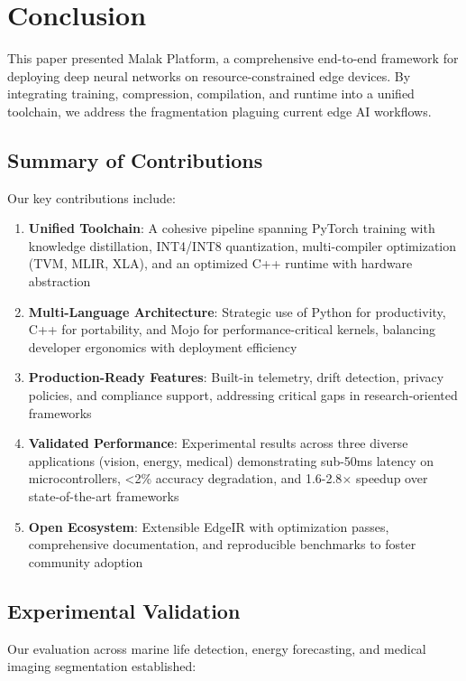 \section{Conclusion}

This paper presented Malak Platform, a comprehensive end-to-end framework for deploying deep neural networks on resource-constrained edge devices. By integrating training, compression, compilation, and runtime into a unified toolchain, we address the fragmentation plaguing current edge AI workflows.

\subsection{Summary of Contributions}

Our key contributions include:

\begin{enumerate}
\item \textbf{Unified Toolchain}: A cohesive pipeline spanning PyTorch training with knowledge distillation, INT4/INT8 quantization, multi-compiler optimization (TVM, MLIR, XLA), and an optimized C++ runtime with hardware abstraction
\item \textbf{Multi-Language Architecture}: Strategic use of Python for productivity, C++ for portability, and Mojo for performance-critical kernels, balancing developer ergonomics with deployment efficiency
\item \textbf{Production-Ready Features}: Built-in telemetry, drift detection, privacy policies, and compliance support, addressing critical gaps in research-oriented frameworks
\item \textbf{Validated Performance}: Experimental results across three diverse applications (vision, energy, medical) demonstrating sub-50ms latency on microcontrollers, <2\% accuracy degradation, and 1.6-2.8$\times$ speedup over state-of-the-art frameworks
\item \textbf{Open Ecosystem}: Extensible EdgeIR with optimization passes, comprehensive documentation, and reproducible benchmarks to foster community adoption
\end{enumerate}

\subsection{Experimental Validation}

Our evaluation across marine life detection, energy forecasting, and medical imaging segmentation established:


